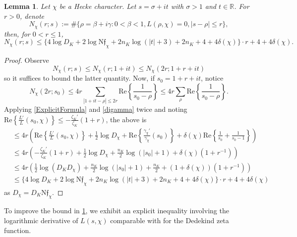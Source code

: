 \documentclass[12pt,psamsfonts]{amsart}
\newtheorem{lem}[thm]{Lemma}
\theoremstyle{definition}
\theoremstyle{remark}
\numberwithin{equation}{section}
\theoremstyle{plain}
\theoremstyle{remark}
\renewcommand{\1}{ {\bf 1}}
\newcommand{\kf}{\mathfrak{f}}
\newcommand{\N}{\mathrm{N}}
\newcommand{\R}{\mathbb{R}}
\renewcommand{\Re}{\mathrm{Re}}
\begin{document}
\begin{lem} \label{ZerosInCircle-Classical}
Let $\chi$ be a Hecke character. Let $s=\sigma+it$ with $\sigma > 1$ and $t \in \R$. For $r > 0$, denote
\[
N_{\chi}(r; s) :=\#\{\rho=\beta+i\gamma: 0 < \beta < 1, L(\rho, \chi)=0,|s-\rho|\leq r\},
\]
then, for $0 < r \leq 1$, 
\[
N_{\chi}(r; s) \leq \{ 4\log D_K + 2 \log \N \kf_{\chi} +2n_K\log(|t|+3) + 2n_K + 4 + 4\delta(\chi) \} \cdot r + 4 + 4\delta(\chi).
\]
\end{lem}
\begin{proof}
	Observe
\[
N_{\chi}(r; s)  \leq N_{\chi}(r; 1+it) \leq N_{\chi}(2r; 1+r+it) 
\]
so it suffices to bound the latter quantity. 
Now, if $s_0=1+r+it$, notice
\[
N_{\chi}(2r; s_0)
	\leq 4r\sum_{|1+it - \rho|\leq 2r}\Re\left\{ \frac{1}{s_0-\rho}\right\} 
	\leq 4r\sum_{\rho}\Re\left\{ \frac{1}{s_0-\rho}\right\}.
\]
Applying \cref{ExplicitFormula} and \cref{digamma} twice and noting $\Re\left\{\frac{L'}{L}(s_0, \chi)\right\} \leq  -\frac{\zeta_K'}{\zeta_K}(1+r)$, the above is
\begin{align*}
&\leq 4r \left(\Re\left\{\frac{L'}{L}(s_0, \chi)\right\}+\frac{1}{2}\log D_{\chi}+\Re\left\{\frac{\gamma_{\chi}'}{\gamma_{\chi}}(s_0)\right\}+\delta(\chi)\Re\left\{\frac{1}{s_0}+\frac{1}{s_0-1}\right\}\right)\\
&\leq 4r \left(-\frac{\zeta_K'}{\zeta_K}(1+r) + \frac{1}{2}\log D_{\chi}  + \frac{n_K}{2} \log(|s_0|+1)  +  \delta(\chi)(1+r^{-1}) \right) \\
&\leq 4r \left(\frac{1}{2}\log(D_{K} D_{\chi})   + \frac{n_K}{2} \log(|s_0|+1) + \frac{n_K}{2} +  (1+\delta(\chi))(1+r^{-1}) \right) \\
&\leq \{ 4\log D_K + 2 \log \N \kf_{\chi} +2n_K\log(|t|+3) + 2n_K + 4 + 4\delta(\chi) \} \cdot r + 4 + 4\delta(\chi)
\end{align*}
as $D_{\chi} = D_K \N\kf_{\chi}$. 
\end{proof}

To improve the bound in \cref{ZerosInCircle-Classical}, we exhibit an explicit inequality involving the logarithmic derivative of $L(s,\chi)$ comparable with \cite[Theorem 2]{KadiriNg} for the Dedekind zeta function. 
\end{document}
